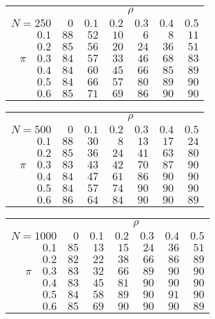 \begin{tabular}{r|rrrrrr}
\hline\hline
 &\multicolumn{6}{c}{$\rho$} \\ 
 $N = 250$ & $0$ & $0.1$ & $0.2$ & $0.3$ & $0.4$ & $0.5$ \\ 
 \hline$0.1$ & $88$ & $52$ & $10$ & $6$ & $8$ & $11$\\ 
$0.2$ & $85$ & $56$ & $20$ & $24$ & $36$ & $51$\\ 
$\pi\quad$$0.3$ & $84$ & $57$ & $33$ & $46$ & $68$ & $83$\\ 
$0.4$ & $84$ & $60$ & $45$ & $66$ & $85$ & $89$\\ 
$0.5$ & $84$ & $66$ & $57$ & $80$ & $89$ & $90$\\ 
$0.6$ & $85$ & $71$ & $69$ & $86$ & $90$ & $90$\\ 
 \hline 
 \end{tabular}
 
 \vspace{2em} 
 
\begin{tabular}{r|rrrrrr}
\hline\hline
 &\multicolumn{6}{c}{$\rho$} \\ 
 $N = 500$ & $0$ & $0.1$ & $0.2$ & $0.3$ & $0.4$ & $0.5$ \\ 
 \hline$0.1$ & $88$ & $30$ & $8$ & $13$ & $17$ & $24$\\ 
$0.2$ & $85$ & $36$ & $24$ & $41$ & $63$ & $80$\\ 
$\pi\quad$$0.3$ & $83$ & $43$ & $42$ & $70$ & $87$ & $90$\\ 
$0.4$ & $84$ & $47$ & $61$ & $86$ & $90$ & $90$\\ 
$0.5$ & $84$ & $57$ & $74$ & $90$ & $90$ & $90$\\ 
$0.6$ & $86$ & $64$ & $84$ & $90$ & $90$ & $89$\\ 
 \hline 
 \end{tabular}
 
 \vspace{2em} 
 
\begin{tabular}{r|rrrrrr}
\hline\hline
 &\multicolumn{6}{c}{$\rho$} \\ 
 $N = 1000$ & $0$ & $0.1$ & $0.2$ & $0.3$ & $0.4$ & $0.5$ \\ 
 \hline$0.1$ & $85$ & $13$ & $15$ & $24$ & $36$ & $51$\\ 
$0.2$ & $82$ & $22$ & $38$ & $66$ & $86$ & $89$\\ 
$\pi\quad$$0.3$ & $83$ & $32$ & $66$ & $89$ & $90$ & $90$\\ 
$0.4$ & $83$ & $45$ & $81$ & $90$ & $90$ & $90$\\ 
$0.5$ & $84$ & $58$ & $89$ & $90$ & $91$ & $90$\\ 
$0.6$ & $85$ & $69$ & $90$ & $90$ & $90$ & $89$\\ 
 \hline 
 \end{tabular}